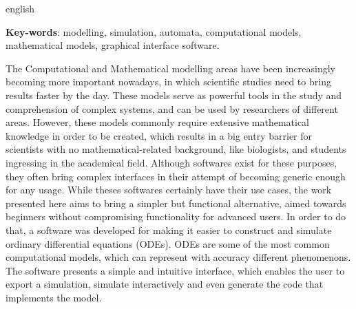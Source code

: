 \begin{resumo}[Abstract]
	\begin{otherlanguage*}{english}
    
    
		\vspace{\onelineskip}
		
		\noindent 
		\textbf{Key-words}: modelling, simulation, automata, computational models, mathematical models, graphical interface software.
		
		The Computational and Mathematical modelling areas have been increasingly becoming more important nowadays, in which scientific studies need to bring results faster by the day. These models serve as powerful tools in the study and comprehension of complex systems, and can be used by researchers of different areas. However, these models commonly require extensive mathematical knowledge in order to be created, which results in a big entry barrier for scientists with no mathematical-related background, like biologists, and students ingressing in the academical field. Although softwares exist for these purposes, they often bring complex interfaces in their attempt of becoming generic enough for any usage. While theses softwares certainly have their use cases, the work presented here aims to bring a simpler but functional alternative, aimed towards beginners without compromising functionality for advanced users. In order to do that, a software was developed for making it easier to construct and simulate ordinary differential equations (ODEs). ODEs are some of the most common computational models, which can represent with accuracy different phenomenons. The software presents a simple and intuitive interface, which enables the user to export a simulation, simulate interactively and even generate the code that implements the model.
	\end{otherlanguage*}
\end{resumo}